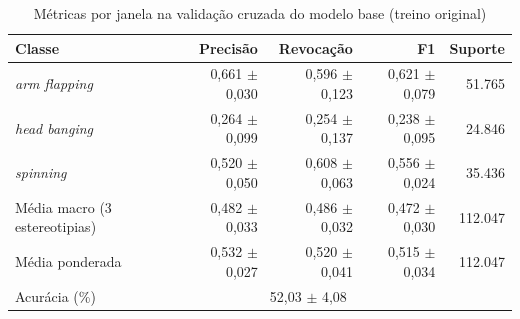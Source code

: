 
\begin{table}[htbp]
\centering
\small
\caption{Métricas por janela na validação cruzada do modelo base (treino original)}
\label{tab:cv-base}
\begin{tabular}{lrrrr}
\toprule
Classe & Precisão & Revocação & F1 & Suporte \\
\midrule
\textit{arm flapping} & 0,661 $\pm$ 0,030 & 0,596 $\pm$ 0,123 & 0,621 $\pm$ 0,079 & 51.765 \\
\textit{head banging} & 0,264 $\pm$ 0,099 & 0,254 $\pm$ 0,137 & 0,238 $\pm$ 0,095 & 24.846 \\
\textit{spinning} & 0,520 $\pm$ 0,050 & 0,608 $\pm$ 0,063 & 0,556 $\pm$ 0,024 & 35.436 \\
\midrule
Média macro (3 estereotipias) & 0,482 $\pm$ 0,033 & 0,486 $\pm$ 0,032 & 0,472 $\pm$ 0,030 & 112.047 \\
Média ponderada & 0,532 $\pm$ 0,027 & 0,520 $\pm$ 0,041 & 0,515 $\pm$ 0,034 & 112.047 \\
\midrule
Acurácia (\%) & \multicolumn{3}{c}{52,03 $\pm$ 4,08} &  \\
\bottomrule
\end{tabular}
\end{table}

